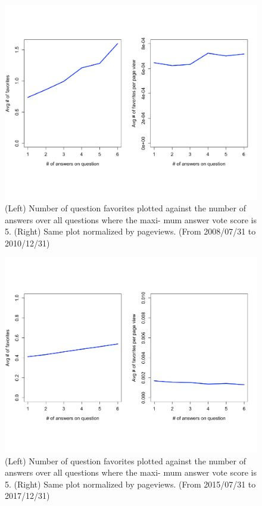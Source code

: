\begin{figure}[!t]
    \centering
    \includegraphics[width=\columnwidth]{img/Fig8_2010.pdf}
    \caption{(Left) Number of question favorites plotted against the number of answers over all questions where the maxi- mum answer vote score is 5. (Right) Same plot normalized by pageviews. (From 2008/07/31 to 2010/12/31)}
    \label{fig:fig8_2010}
\end{figure}

\begin{figure}[!t]
    \centering
    \includegraphics[width=\columnwidth]{img/Fig8_2017.pdf}
    \caption{(Left) Number of question favorites plotted against the number of answers over all questions where the maxi- mum answer vote score is 5. (Right) Same plot normalized by pageviews. (From 2015/07/31 to 2017/12/31)}
    \label{fig:fig8_2017}
\end{figure}

